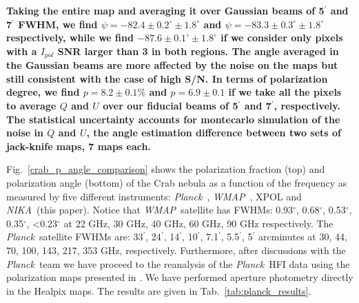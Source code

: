 \documentclass[twocolumn,traditabstract]{aa}
\def\NIKA{\textit{NIKA}}
\def\Planck{\textit{Planck}}
\def\WMAP{\textit{WMAP}}
\begin{document}
 \textbf{Taking
  the entire map and averaging it over Gaussian beams of 5$^{\prime}$ and
  7$^{\prime}$ FWHM, we find $\psi = -82.4 \pm 0.2^{\circ} \pm 1.8^{\circ}$ and $\psi =
  -83.3 \pm 0.3^{\circ} \pm 1.8^{\circ}$ respectively, while we find $-87.6 \pm 0.1^{\circ} \pm 1.8^{\circ}$ 
  if we consider only pixels with a $I_{pol}$ SNR larger than 3 in both regions. 
  The angle averaged in the Gaussian beams are more affected by the noise on the maps but still consistent with the case of high S/N. 
  In terms of polarization degree, we find $p = 8.2 \pm 0.1 \%$	
  and $p = 6.9 \pm 0.1$ if we take all the pixels to average $Q$
  and $U$ over our fiducial beams of 5$^{\prime}$ and 7$^{\prime}$,
  respectively. 
The statistical uncertainty accounts for montecarlo simulation of the noise in $Q$ and $U$, the angle estimation difference between two sets of jack-knife maps, 7 maps each.}
  
Fig.~\ref{crab_p_angle_comparison} shows the polarization fraction (top) and polarization angle (bottom) of the Crab nebula as a function of the frequency as measured by
five different instruments: \Planck\ \citep{2015arXiv150702058P},
\WMAP\ \citep{2011ApJS..192...19W}, XPOL \citep{aumont2010} and \NIKA\ (this paper). 
Notice that \WMAP\ satellite has FWHMs: 0.93$^{\circ}$, 0.68$^{\circ}$, 0.53$^{\circ}$, 0.35$^{\circ}$, \textless 0.23$^{\circ}$ at 22 GHz, 30 GHz, 40 GHz, 60 GHz, 90 GHz respectively.  
The \Planck\ satellite FWHMs are: 33$^{\prime}$, 24$^{\prime}$, 14$^{\prime}$, 10$^{\prime}$, 7.1$^{\prime}$, 5.5$^{\prime}$, 5$^{\prime}$ arcminutes at 30, 44, 70, 100, 143, 217, 353 GHz, respectively. Furthermore, after discussions with the \Planck\ team we have proceed to the reanalysis of the \Planck\ HFI data using the polarization maps presented in \cite{refId0}. We have performed aperture photometry directly in the Healpix maps. The results are given in Tab.~\ref{tab:planck_results}.
\end{document}

